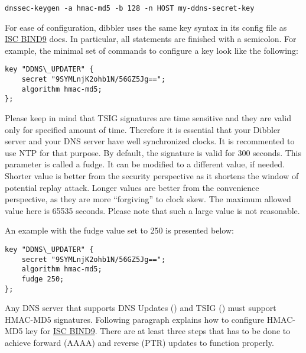 \begin{lstlisting}
dnssec-keygen -a hmac-md5 -b 128 -n HOST my-ddns-secret-key
\end{lstlisting}

For ease of configuration, dibbler uses the same key syntax in its
config file as \href{http://www.isc.org/software/bind}{ISC BIND9}
does. In particular, all statements are finished with a semicolon. For
example, the minimal set of commands to configure a key look like the
following:

\begin{lstlisting}
key "DDNS\_UPDATER" {
    secret "9SYMLnjK2ohb1N/56GZ5Jg==";
    algorithm hmac-md5;
};
\end{lstlisting}

Please keep in mind that TSIG signatures are time sensitive and they
are valid only for specified amount of time. Therefore it is essential
that your Dibbler server and your DNS server have well synchronized
clocks. It is recommented to use NTP for that purpose. By default, the
signature is valid for 300 seconds. This parameter is called a
fudge. It can be modified to a different value, if needed. Shorter
value is better from the security perspective as it shortens the
window of potential replay attack. Longer values are better from the
convenience perspective, as they are more ``forgiving'' to clock
skew. The maximum allowed value here is 65535 seconds. Please note
that such a large value is not reasonable.

An example with the fudge value set to 250 is presented below:

\begin{lstlisting}
key "DDNS\_UPDATER" {
    secret "9SYMLnjK2ohb1N/56GZ5Jg==";
    algorithm hmac-md5;
    fudge 250;
};
\end{lstlisting}

Any DNS server that supports DNS Updates (\cite{rfc2136}) and TSIG
(\cite{rfc2845}) must support HMAC-MD5 signatures. Following paragraph
explains how to configure HMAC-MD5 key
for \href{http://www.isc.org/software/bind}{ISC BIND9}. There are at
least three steps that has to be done to achieve forward (AAAA) and
reverse (PTR) updates to function properly.


